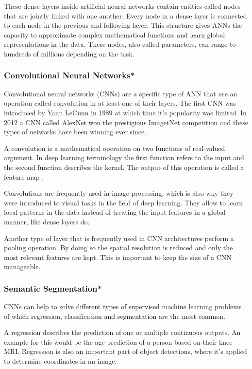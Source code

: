 These dense layers inside artificial neural networks contain entities called nodes that are jointly linked with one another. Every node in a dense layer is connected to each node in the previous and following layer. This structure gives ANNs the capacity to approximate complex mathematical functions and learn global representations in the data. These nodes, also called parameters, can range to hundreds of millions depending on the task.

\subsubsection{Convolutional Neural Networks*}

Convolutional neural networks (CNNs) are a specific type of ANN that use an operation called convolution in at least one of their layers. The first CNN was introduced by Yann LeCunn \cite{LeCun1998} in 1989 at which time it's popularity was limited. In 2012 a CNN called AlexNet \cite{Krizhevsky} won the prestigious ImagetNet competition and these types of networks have been winning ever since.

A convolution is a mathematical operation on two functions of real-valued argument. In deep learning terminology the first function refers to the input and the second function describes the kernel. The output of this operation is called a feature map \cite{Goodfellow2016}.

Convolutions are frequently used in image processing, which is also why they were introduced to visual tasks in the field of deep learning. They allow to learn local patterns in the data instead of treating the input features in a global manner, like dense layers do.

Another type of layer that is frequently used in CNN architectures perform a pooling operation. By doing so the spatial resolution is reduced and only the most relevant features are kept. This is important to keep the size of a CNN manageable.

\subsubsection{Semantic Segmentation*}

CNNs can help to solve different types of supervised machine learning problems of which regression, classification and segmentation are the most common.

A regression describes the prediction of one or multiple continuous outputs. An example for this would be the age prediction of a person based on their knee MRI. Regression is also an important part of object detections, where it's applied to determine coordinates in an image.

